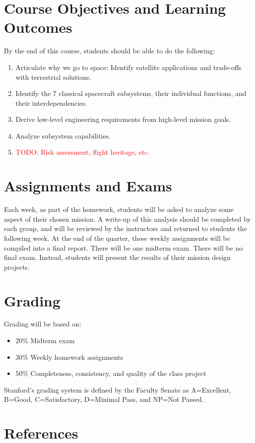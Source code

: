 \documentclass[11pt,letterpaper]{article}
\newcommand{\todo}[1]{\textcolor{red}{TODO: #1}}
\begin{document}
\section*{Course Objectives and Learning Outcomes}
By the end of this course, students should be able to do the following:
\begin{enumerate}
	\item Articulate why we go to space: Identify satellite applications and trade-offs with terrestrial solutions.
	\item Identify the 7 classical spacecraft subsystems, their individual functions, and their interdependencies.
	\item Derive low-level engineering requirements from high-level mission goals.
	\item Analyze subsystem capabilities.
	\item \todo{Risk assessment, flight heritage, etc.}
\end{enumerate}

\section*{Assignments and Exams}

Each week, as part of the homework, students will be asked to analyze some aspect of their chosen mission. A write-up of this analysis should be completed by each group, and will be reviewed by the instructors and returned to students the following week. At the end of the quarter, these weekly assignments will be compiled into a final report. There will be one midterm exam. There will be no final exam. Instead, students will present the results of their mission design projects.

\section*{Grading}

Grading will be based on:
\begin{itemize}
	\item 20\% Midterm exam
	\item 30\% Weekly homework assignments
	\item 50\% Completeness, consistency, and quality of the class project
\end{itemize}
Stanford's grading system is defined by the Faculty Senate as A=Excellent, B=Good, C=Satisfactory, D=Minimal Pass, and NP=Not Passed.

\section*{References}
\end{document}

